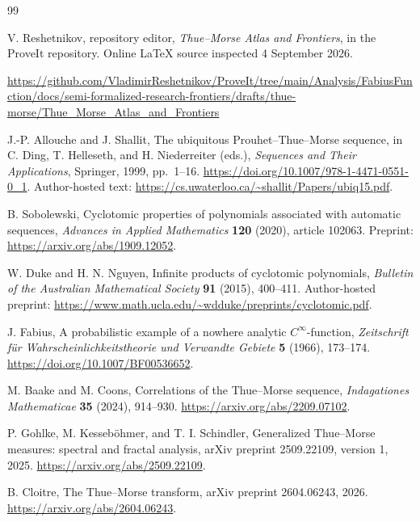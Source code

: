 \documentclass[11pt,letterpaper]{article}
\numberwithin{equation}{section}
\theoremstyle{definition}
\theoremstyle{remark}
\begin{document}
\begin{thebibliography}{99}

V. Reshetnikov, repository editor,
\emph{Thue--Morse Atlas and Frontiers}, in the ProveIt repository.
Online LaTeX source inspected 4 September 2026.\par
\url{https://github.com/VladimirReshetnikov/ProveIt/tree/main/Analysis/FabiusFunction/docs/semi-formalized-research-frontiers/drafts/thue-morse/Thue_Morse_Atlas_and_Frontiers}

J.-P. Allouche and J. Shallit,
The ubiquitous Prouhet--Thue--Morse sequence,
in C. Ding, T. Helleseth, and H. Niederreiter (eds.),
\emph{Sequences and Their Applications}, Springer, 1999, pp.~1--16.
\url{https://doi.org/10.1007/978-1-4471-0551-0_1}.
Author-hosted text: \url{https://cs.uwaterloo.ca/~shallit/Papers/ubiq15.pdf}.

B. Sobolewski,
Cyclotomic properties of polynomials associated with automatic sequences,
\emph{Advances in Applied Mathematics} \textbf{120} (2020), article 102063.
Preprint: \url{https://arxiv.org/abs/1909.12052}.

W. Duke and H. N. Nguyen,
Infinite products of cyclotomic polynomials,
\emph{Bulletin of the Australian Mathematical Society} \textbf{91} (2015), 400--411.
Author-hosted preprint: \url{https://www.math.ucla.edu/~wdduke/preprints/cyclotomic.pdf}.

J. Fabius,
A probabilistic example of a nowhere analytic \(C^\infty\)-function,
\emph{Zeitschrift f\"ur Wahrscheinlichkeitstheorie und Verwandte Gebiete}
\textbf{5} (1966), 173--174.
\url{https://doi.org/10.1007/BF00536652}.

M. Baake and M. Coons,
Correlations of the Thue--Morse sequence,
\emph{Indagationes Mathematicae} \textbf{35} (2024), 914--930.
\url{https://arxiv.org/abs/2209.07102}.

P. Gohlke, M. Kesseb\"ohmer, and T. I. Schindler,
Generalized Thue--Morse measures: spectral and fractal analysis,
arXiv preprint 2509.22109, version 1, 2025.
\url{https://arxiv.org/abs/2509.22109}.

B. Cloitre,
The Thue--Morse transform,
arXiv preprint 2604.06243, 2026.
\url{https://arxiv.org/abs/2604.06243}.

\end{thebibliography}
\end{document}
